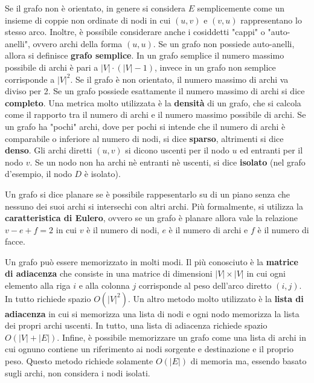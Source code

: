 \documentclass[12pt,a4paper]{book} %
\begin{document}
	Se il grafo non è orientato, in genere si considera $E$ semplicemente come un insieme di coppie non ordinate di nodi in cui $(u,v)$ e $(v,u)$ rappresentano lo stesso arco.
	Inoltre, è possibile considerare anche i cosiddetti "cappi" o "auto-anelli", ovvero archi della forma $(u,u)$. Se un grafo non possiede auto-anelli, allora si definisce \textbf{grafo semplice}. In un grafo semplice il numero massimo possibile di archi è pari a $|V|\cdot (|V|-1)$, invece in un grafo non semplice corrisponde a $|V|^2$. Se il grafo è non orientato, il numero massimo di archi va diviso per 2. Se un grafo possiede esattamente il numero massimo di archi si dice \textbf{completo}.
	Una metrica molto utilizzata è la \textbf{densità} di un grafo, che si calcola come il rapporto tra il numero di archi e il numero massimo possibile di archi. Se un grafo ha "pochi" archi, dove per pochi si intende che il numero di archi è comparabile o inferiore al numero di nodi, si dice \textbf{sparso}, altrimenti si dice \textbf{denso}. Gli archi diretti $(u,v)$ si dicono uscenti per il nodo $u$ ed entranti per il nodo $v$. Se un nodo non ha archi nè entranti nè uscenti, si dice \textbf{isolato} (nel grafo d'esempio, il nodo $D$ è isolato).
	
	Un grafo si dice planare se è possibile rappesentarlo su di un piano senza che nessuno dei suoi archi si intersechi con altri archi. Più formalmente, si utilizza la \textbf{caratteristica di Eulero}, ovvero se un grafo è planare allora vale la relazione $v-e+f=2$ in cui $v$ è il numero di nodi, $e$ è il numero di archi e $f$ è il numero di facce.
	
	Un grafo può essere memorizzato in molti modi. Il più conosciuto è la \textbf{matrice di adiacenza} che consiste in una matrice di dimensioni $|V|\times |V|$ in cui ogni elemento alla riga $i$ e alla colonna $j$ corrisponde al peso dell'arco diretto $(i,j)$. In tutto richiede spazio $O(|V|^2)$. Un altro metodo molto utilizzato è la \textbf{lista di adiacenza} in cui si memorizza una lista di nodi e ogni nodo memorizza la lista dei propri archi uscenti. In tutto, una lista di adiacenza richiede spazio $O(|V|+|E|)$. Infine, è possibile memorizzare un grafo come una lista di archi in cui ognuno contiene un riferimento ai nodi sorgente e destinazione e il proprio peso. Questo metodo richiede solamente $O(|E|)$ di memoria ma, essendo basato sugli archi, non considera i nodi isolati.
	
\end{document}
